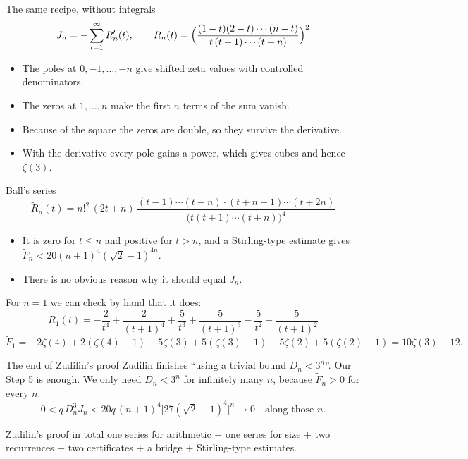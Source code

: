\documentclass[aspectratio=169,11pt]{beamer}
\newcommand{\Dn}{D_n}
\begin{document}
\begin{frame}{The same recipe, without integrals}
  \[
    J_n=-\sum_{t=1}^\infty R_n'(t),\qquad R_n(t)=\Bigl(\frac{(1-t)(2-t)\cdots(n-t)}{t\,(t+1)\cdots(t+n)}\Bigr)^2
  \]
  \begin{itemize}
    \item The poles at $0,-1,\dots,-n$ give shifted zeta values with controlled denominators.
    \item The zeros at $1,\dots,n$ make the first $n$ terms of the sum vanish.
    \item Because of the square the zeros are double, so they survive the derivative.
    \item With the derivative every pole gains a power, which gives cubes and hence $\zeta(3)$.
  \end{itemize}
\end{frame}

\begin{frame}{Ball's series}
  \[
    \widetilde R_n(t)=n!^2\,(2t+n)\,
    \frac{(t-1)\cdots(t-n)\cdot(t+n+1)\cdots(t+2n)}{\bigl(t(t+1)\cdots(t+n)\bigr)^4}
  \]
  \begin{itemize}
    \item It is zero for $t\le n$ and positive for $t>n$, and a Stirling-type estimate gives
      $\widetilde F_n<20(n+1)^4(\sqrt2-1)^{4n}$.
    \item There is no obvious reason why it should equal $J_n$.
  \end{itemize}
  For $n=1$ we can check by hand that it does:
  \[
    \widetilde R_1(t)=-\frac2{t^4}+\frac2{(t+1)^4}+\frac5{t^3}+\frac5{(t+1)^3}-\frac5{t^2}+\frac5{(t+1)^2}
  \]
  \[
    \widetilde F_1=-2\zeta(4)+2(\zeta(4)-1)+5\zeta(3)+5(\zeta(3)-1)-5\zeta(2)+5(\zeta(2)-1)=10\zeta(3)-12 .
  \]
\end{frame}

\begin{frame}{The end of Zudilin's proof}
  Zudilin finishes ``using a trivial bound $\Dn<3^n$''. Our Step 5 is enough.
  We only need $\Dn<3^n$ for infinitely many $n$, because $\widetilde F_n>0$ for every $n$:
  \[
    0<q\,\Dn^3J_n<20q\,(n+1)^4\bigl[27(\sqrt2-1)^4\bigr]^n\longrightarrow0
    \quad\text{along those }n .
  \]
  \begin{block}{Zudilin's proof in total}
    one series for arithmetic $+$ one series for size $+$ two recurrences
    $+$ two certificates $+$ a bridge $+$ Stirling-type estimates.
  \end{block}
\end{frame}
\end{document}
